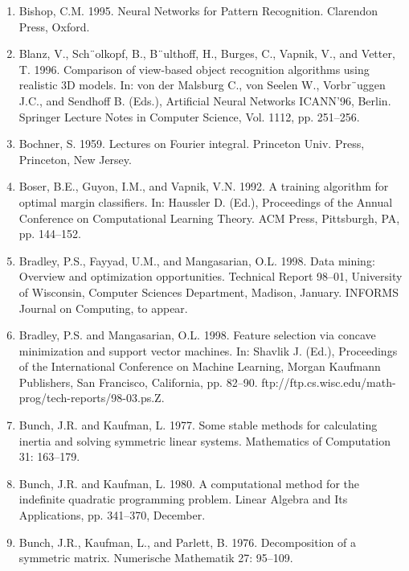 \documentclass[fleqn,10pt]{olplainarticle}
\begin{document}
\begin{enumerate}
    \item Bishop, C.M. 1995. Neural Networks for Pattern Recognition. Clarendon Press, Oxford.

    \item Blanz, V., Sch¨olkopf, B., B¨ulthoff, H., Burges, C., Vapnik, V., and Vetter, T. 1996. Comparison of view-based object recognition algorithms using realistic 3D models. In: von der Malsburg C., von Seelen W., Vorbr¨uggen J.C., and Sendhoff B. (Eds.), Artificial Neural Networks ICANN’96, Berlin. Springer Lecture Notes in Computer Science, Vol. 1112, pp. 251–256.

    \item Bochner, S. 1959. Lectures on Fourier integral. Princeton Univ. Press, Princeton, New Jersey.

    \item Boser, B.E., Guyon, I.M., and Vapnik, V.N. 1992. A training algorithm for optimal margin classifiers. In: Haussler D. (Ed.), Proceedings of the Annual Conference on Computational Learning Theory. ACM Press, Pittsburgh, PA, pp. 144–152.

    \item Bradley, P.S., Fayyad, U.M., and Mangasarian, O.L. 1998. Data mining: Overview and optimization opportunities. Technical Report 98–01, University of Wisconsin, Computer Sciences Department, Madison, January. INFORMS Journal on Computing, to appear.

    \item Bradley, P.S. and Mangasarian, O.L. 1998. Feature selection via concave minimization and support vector machines. In: Shavlik J. (Ed.), Proceedings of the International Conference on Machine Learning, Morgan Kaufmann Publishers, San Francisco, California, pp. 82–90. ftp://ftp.cs.wisc.edu/math-prog/tech-reports/98-03.ps.Z.

    \item Bunch, J.R. and Kaufman, L. 1977. Some stable methods for calculating inertia and solving symmetric linear systems. Mathematics of Computation 31: 163–179.

    \item Bunch, J.R. and Kaufman, L. 1980. A computational method for the indefinite quadratic programming problem. Linear Algebra and Its Applications, pp. 341–370, December.

    \item Bunch, J.R., Kaufman, L., and Parlett, B. 1976. Decomposition of a symmetric matrix. Numerische Mathematik 27: 95–109.


\end{enumerate}
\end{document}
